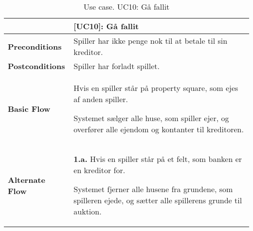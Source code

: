 \documentclass[class=article, crop=false]{standalone}
\begin{document}
    \begin{table}[H]
        \caption{Use case. UC10: Gå fallit}
        \begin{tabularx}{\textwidth}{|l|X|}
            \hline
            & \textbf{[UC10]: Gå fallit}   \\ \hline
            \textbf{Preconditions}       & Spiller har ikke penge nok til at betale til sin kreditor.\\ \hline
            \textbf{Postconditions}      & Spiller har forladt spillet. \\ \hline


            \textbf{Basic Flow} & \begin{tabenum}
                                      \item Hvis en spiller står på property square, som ejes af anden spiller.
                                      \item Systemet sælger alle huse, som spiller ejer, og overfører alle ejendom og kontanter til kreditoren.
            \end{tabenum}   \\ \hline




            \textbf{Alternate Flow}   & \textbf{1.a.} Hvis en spiller står på et felt, som banken er en kreditor for.
            \begin{enumerate} \begin{tabenum}
                                  \item Systemet fjerner alle husene fra grundene, som spilleren ejede, og sætter alle spillerens grunde til auktion.
            \end{tabenum} \end{enumerate}
            \\



            \hline

        \end{tabularx}


    \end{table}
\end{document}
